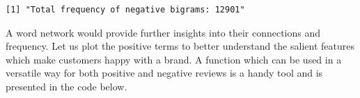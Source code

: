 \begin{Shaded}
\begin{Highlighting}[]
\NormalTok{(}\NormalTok{(}
\end{Highlighting}
\end{Shaded}

\begin{verbatim}
[1] "Total frequency of negative bigrams: 12901"
\end{verbatim}

A word network would provide further insights into their connections and
frequency. Let us plot the positive terms to better understand the
salient features which make customers happy with a brand. A function which can be used in a versatile way for both positive and
negative reviews is a handy tool and is presented in the code below.

